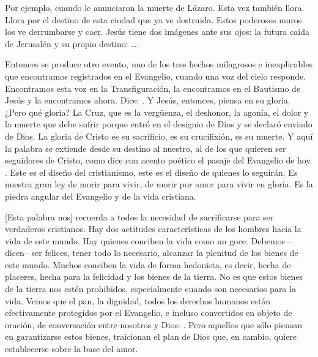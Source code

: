 \begin{body}

Por ejemplo, cuando le anunciaron la muerte de Lázaro. Esta vez también llora. Llora por el destino de esta ciudad que ya ve destruida. Estos poderosos muros los ve derrumbarse y caer. Jesús tiene dos imágenes ante sus ojos: la futura caída de Jerusalén y su propio destino: \ldots {}.

Entonces se produce otro evento, uno de los tres hechos milagrosos e inexplicables que encontramos registrados en el Evangelio, cuando una voz del cielo responde. Encontramos esta voz en la Transfiguración, la encontramos en el Bautismo de Jesús y la encontramos ahora. Dice: . Y Jesús, entonces, piensa en su gloria. ¿Pero qué gloria? La Cruz, que es la vergüenza, el deshonor, la agonía, el dolor y la muerte que debe sufrir porque entró en el designio de Dios y se declaró enviado de Dios. La gloria de Cristo es su sacrificio, es su crucifixión, es su muerte. Y aquí la palabra se extiende desde su destino al nuestro, al de los que quieren ser seguidores de Cristo, como dice con acento poético el pasaje del Evangelio de hoy. . Este es el diseño del cristianismo, este es el diseño de quienes lo seguirán. Es nuestra gran ley de morir para vivir, de morir por amor para vivir en gloria. Es la piedra angular del Evangelio y de la vida cristiana.

[Esta palabra nos] recuerda a todos la necesidad de sacrificarse para ser verdaderos cristianos. Hay dos actitudes características de los hombres hacia la vida de este mundo. Hay quienes conciben la vida como un goce. Debemos –dicen– ser felices, tener todo lo necesario, alcanzar la plenitud de los bienes de este mundo. Muchos conciben la vida de forma hedonista, es decir, hecha de placeres, hecha para la felicidad y los bienes de la tierra. No es que estos bienes de la tierra nos estén prohibidos, especialmente cuando son necesarios para la vida. Vemos que el pan, la dignidad, todos los derechos humanos están efectivamente protegidos por el Evangelio, e incluso convertidos en objeto de oración, de conversación entre nosotros y Dios: . Pero aquellos que sólo piensan en garantizarse estos bienes, traicionan el plan de Dios que, en cambio, quiere establecerse sobre la base del amor.


\end{body}
